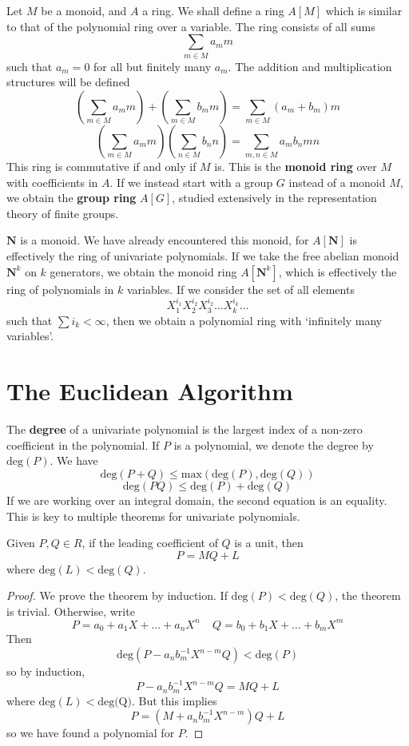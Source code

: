 Let $M$ be a monoid, and $A$ a ring. We shall define a ring $A[M]$ which is similar to that of the polynomial ring over a variable. The ring consists of all sums
%
\[ \sum_{m \in M} a_m m \]
%
such that $a_m = 0$ for all but finitely many $a_m$. The addition and multiplication structures will be defined
%
\[ \left( \sum_{m \in M} a_m m \right) + \left( \sum_{m \in M} b_m m \right) = \sum_{m \in M} (a_m + b_m) m \]
%
\[ \left( \sum_{m \in M} a_m m \right) \left( \sum_{n \in M} b_n n \right) = \sum_{m,n \in M} a_m b_n m n \]
%
This ring is commutative if and only if $M$ is. This is the {\bf monoid ring} over $M$ with coefficients in $A$. If we instead start with a group $G$ instead of a monoid $M$, we obtain the {\bf group ring} $A[G]$, studied extensively in the representation theory of finite groups.

\begin{example}
    $\mathbf{N}$ is a monoid. We have already encountered this monoid, for $A[\mathbf{N}]$ is effectively the ring of univariate polynomials. If we take the free abelian monoid $\mathbf{N}^k$ on $k$ generators, we obtain the monoid ring $A[\mathbf{N}^k]$, which is effectively the ring of polynomials in $k$ variables. If we consider the set of all elements
    \[ X_1^{i_1} X_2^{i_2} X_3^{i_2} \dots X_k^{i_k} \dots \]
    such that $\sum i_k < \infty$, then we obtain a polynomial ring with `infinitely many variables'.
\end{example}



\section{The Euclidean Algorithm}

The {\bf degree} of a univariate polynomial is the largest index of a non-zero coefficient in the polynomial. If $P$ is a polynomial, we denote the degree by $\text{deg}(P)$. We have
%
\[ \text{deg}(P + Q) \leq \text{max}(\text{deg}(P), \text{deg}(Q)) \]
%
%
\[ \text{deg}(PQ) \leq \text{deg}(P) + \text{deg}(Q) \]
%
If we are working over an integral domain, the second equation is an equality. This is key to multiple theorems for univariate polynomials.

\begin{theorem}
    Given $P,Q \in R$, if the leading coefficient of $Q$ is a unit, then
    \[ P = MQ + L \]
    where $\text{deg}(L) < \text{deg}(Q)$.
\end{theorem}
\begin{proof}
    We prove the theorem by induction. If $\text{deg}(P) < \text{deg}(Q)$, the theorem is trivial. Otherwise, write
    \[ P = a_0 + a_1 X + \dots + a_n X^n\ \ \ \ \ Q = b_0 + b_1 X + \dots + b_m X^m \]
    Then
    \[ \text{deg}(P - a_n b_m^{-1} X^{n - m} Q) < \text{deg}(P) \]
    so by induction,
    \[ P - a_n b_m^{-1} X^{n-m} Q = MQ + L \]
    where $\text{deg}(L) < \text{deg(Q)}$. But this implies
    \[ P = (M + a_n b_m^{-1} X^{n-m}) Q + L \]
    so we have found a polynomial for $P$.
\end{proof}

